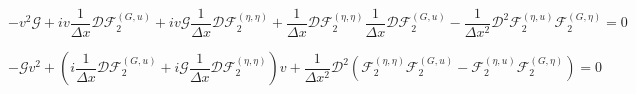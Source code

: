 \documentclass[12pt]{article}
\begin{document}
\[-v^2\mathcal{G} +iv\frac{1}{\Delta x} \mathcal{D}\mathcal{F}_2^{(G,u)} + iv\mathcal{G}\frac{1}{\Delta x} \mathcal{D}\mathcal{F}_2^{(\eta,\eta)} + \frac{1}{\Delta x} \mathcal{D}\mathcal{F}_2^{(\eta,\eta)}\frac{1}{\Delta x} \mathcal{D}\mathcal{F}_2^{(G,u)} - \frac{1}{\Delta x^2} \mathcal{D}^2\mathcal{F}_2^{(\eta,u)}\mathcal{F}_2^{(G,\eta)} = 0\]

\[- \mathcal{G}v^2 +\left(i\frac{1}{\Delta x} \mathcal{D}\mathcal{F}_2^{(G,u)} + i\mathcal{G}\frac{1}{\Delta x} \mathcal{D}\mathcal{F}_2^{(\eta,\eta)}\right)v + \frac{1}{\Delta x^2} \mathcal{D} ^2 \left(\mathcal{F}_2^{(\eta,\eta)}\mathcal{F}_2^{(G,u)} - \mathcal{F}_2^{(\eta,u)}\mathcal{F}_2^{(G,\eta)}\right) = 0\]
\end{document}
